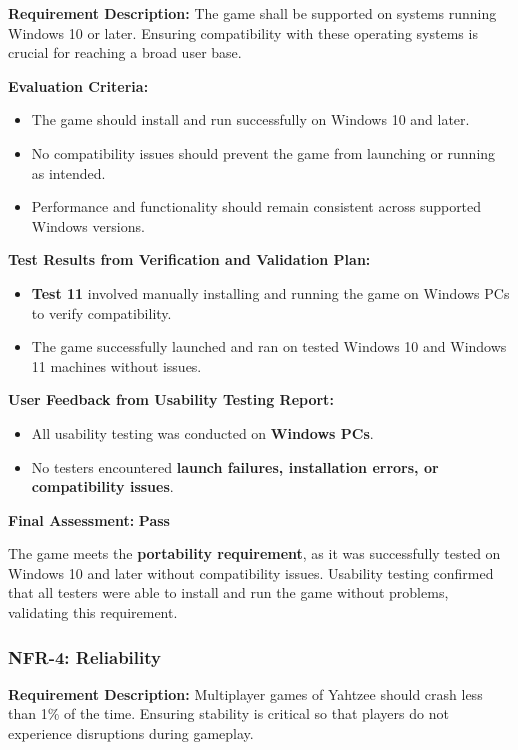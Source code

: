 \documentclass[12pt, titlepage]{article}
\begin{document}
\textbf{Requirement Description:}  
The game shall be supported on systems running Windows 10 or later. Ensuring compatibility with these operating systems is crucial for reaching a broad user base.

\textbf{Evaluation Criteria:}  
\begin{itemize}
    \item The game should install and run successfully on Windows 10 and later.
    \item No compatibility issues should prevent the game from launching or running as intended.
    \item Performance and functionality should remain consistent across supported Windows versions.
\end{itemize}

\textbf{Test Results from Verification and Validation Plan:}  
\begin{itemize}
    \item \textbf{Test 11} involved manually installing and running the game on Windows PCs to verify compatibility.
    \item The game successfully launched and ran on tested Windows 10 and Windows 11 machines without issues.
\end{itemize}

\textbf{User Feedback from Usability Testing Report:}  
\begin{itemize}
    \item All usability testing was conducted on \textbf{Windows PCs}.
    \item No testers encountered \textbf{launch failures, installation errors, or compatibility issues}.
\end{itemize}

\textbf{Final Assessment:} \textbf{Pass}  

The game meets the \textbf{portability requirement}, as it was successfully tested on Windows 10 and later without compatibility issues. Usability testing confirmed that all testers were able to install and run the game without problems, validating this requirement.

\subsubsection{NFR-4: Reliability}

\textbf{Requirement Description:}  
Multiplayer games of Yahtzee should crash less than 1\% of the time. Ensuring stability is critical so that players do not experience disruptions during gameplay.
\end{document}
